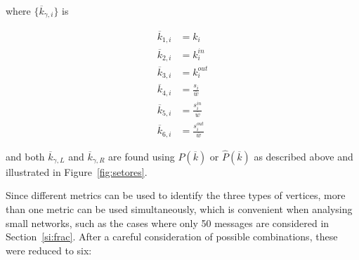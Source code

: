\noindent where $\{\overline{k}_{\gamma,i}\}$ is

\begin{equation}
\begin{split}
\overline{k}_{1,i}&=k_i \\
\overline{k}_{2,i}&=k_i^{in} \\
\overline{k}_{3,i}&=k_i^{out} \\
\overline{k}_{4,i}&=\frac{s_i}{\overline{w}} \\
\overline{k}_{5,i}&=\frac{s_i^{in}}{\overline{w}} \\
\overline{k}_{6,i}&=\frac{s_i^{out}}{\overline{w}}
\end{split}
\end{equation}

\noindent and both $\overline{k}_{\gamma,L}$ and $\overline{k}_{\gamma,R}$ are found using $P(\overline{k})$ or $\hat{P}(\overline{k})$ as described above and illustrated in Figure~\ref{fig:setores}.

Since different metrics can be used to identify the three types of vertices, more than one metric can be used simultaneously, which is convenient when analysing small networks,
such as the cases where only 50 messages are considered in Section~\ref*{si:frac}.
After a careful consideration of possible combinations, these were reduced to six:

